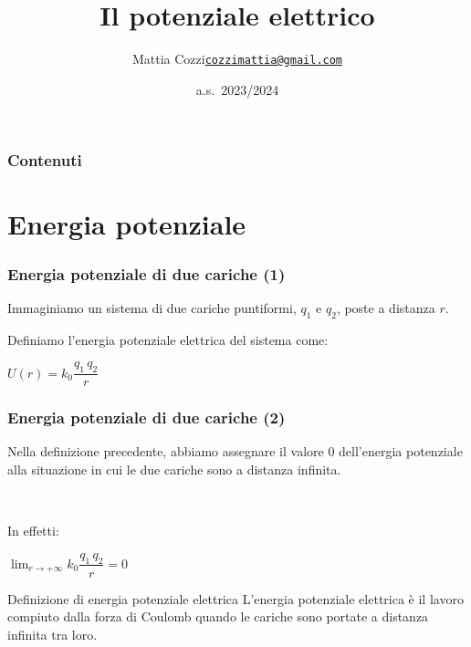 \documentclass[]{beamer}
\title{Il potenziale elettrico}
\author{\texorpdfstring{Mattia Cozzi\newline\href{mailto:cozzimattia@gmail.com}{\texttt{cozzimattia@gmail.com}}}{Mattia Cozzi}}
\date{a.s.~2023/2024}
\theoremstyle{plain}
\begin{document}
\begin{frame}
  \titlepage
\end{frame}





\begin{frame}
\frametitle{Contenuti}
\tableofcontents
\end{frame}


\section{Energia potenziale}



\begin{frame}
\frametitle{Energia potenziale di due cariche (1)}
Immaginiamo un sistema di due cariche puntiformi, $ q_1 $ e $ q_2 $, poste a distanza $ r $.
\begin{figure}
\end{figure}\pause
Definiamo l'energia potenziale elettrica del sistema come:
\begin{center}
\colorbox{marroncino!30}{$ U(r) = k_0 \dfrac{q_1 \, q_2}{r} $}
\end{center}
\end{frame}



\begin{frame}
\frametitle{Energia potenziale di due cariche (2)}
Nella definizione precedente, abbiamo assegnare il valore $ 0 $ dell'energia potenziale alla situazione in cui le due cariche sono a distanza infinita.
\pause

~

In effetti:
\begin{center}
$ \displaystyle \lim_{r \to + \infty} k_0 \dfrac{q_1 \, q_2}{r} = 0 $
\end{center}\pause

\begin{block}{Definizione di energia potenziale elettrica}
L'energia potenziale elettrica è il lavoro compiuto dalla forza di Coulomb quando le cariche sono portate a distanza infinita tra loro.
\end{block}
\end{frame}
\end{document}
